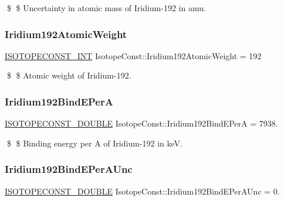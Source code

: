 \$ \$ Uncertainty in atomic mass of Iridium-\/192 in amu. \mbox{\label{group___isotope_const-_iridium-_ir192_ga75012668ef07c5a37ae57e47016bc455}} 
\subsubsection{\texorpdfstring{Iridium192\+Atomic\+Weight}{Iridium192AtomicWeight}}
{\footnotesize\ttfamily \mbox{\hyperlink{group___isotope_const-_macros_ga5f18360b3e99483a35c32d789e62621c}{I\+S\+O\+T\+O\+P\+E\+C\+O\+N\+S\+T\+\_\+\+I\+NT}} Isotope\+Const\+::\+Iridium192\+Atomic\+Weight = 192}

\$ \$ Atomic weight of Iridium-\/192. \mbox{\label{group___isotope_const-_iridium-_ir192_ga143ddfe1d6071a288d705c99a314875a}} 
\subsubsection{\texorpdfstring{Iridium192\+Bind\+E\+PerA}{Iridium192BindEPerA}}
{\footnotesize\ttfamily \mbox{\hyperlink{group___isotope_const-_macros_ga8f45a7272ce02c0b4c65c44636ed719a}{I\+S\+O\+T\+O\+P\+E\+C\+O\+N\+S\+T\+\_\+\+D\+O\+U\+B\+LE}} Isotope\+Const\+::\+Iridium192\+Bind\+E\+PerA = 7938.}

\$ \$ Binding energy per A of Iridium-\/192 in keV. \mbox{\label{group___isotope_const-_iridium-_ir192_ga250b92d7f66951015742eca9b0911b79}} 
\subsubsection{\texorpdfstring{Iridium192\+Bind\+E\+Per\+A\+Unc}{Iridium192BindEPerAUnc}}
{\footnotesize\ttfamily \mbox{\hyperlink{group___isotope_const-_macros_ga8f45a7272ce02c0b4c65c44636ed719a}{I\+S\+O\+T\+O\+P\+E\+C\+O\+N\+S\+T\+\_\+\+D\+O\+U\+B\+LE}} Isotope\+Const\+::\+Iridium192\+Bind\+E\+Per\+A\+Unc = 0.}

